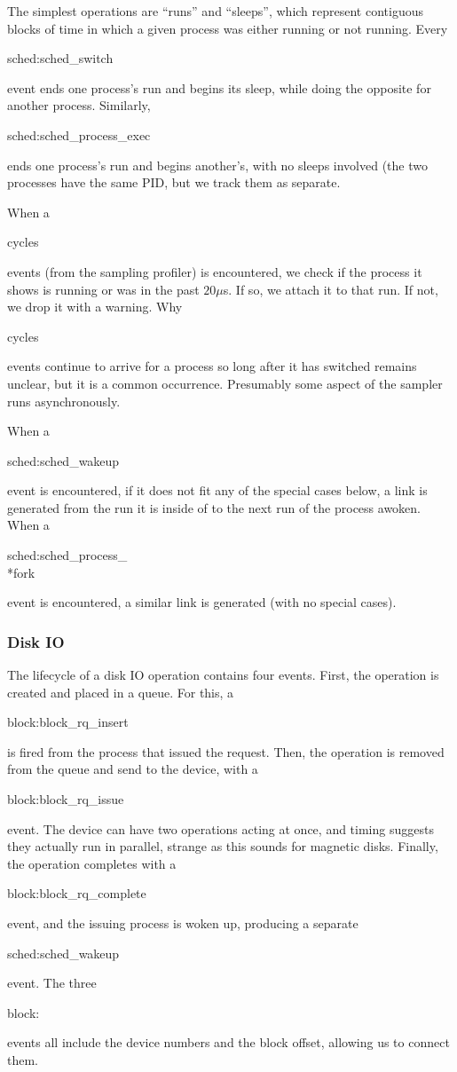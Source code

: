 \documentclass[10pt]{article}
\begin{document}
The simplest operations are ``runs'' and ``sleeps'', which represent contiguous blocks of time in which a given process was either running or not running.  Every \begin{tt}sched:sched\_switch\end{tt} event ends one process's run and begins its sleep, while doing the opposite for another process.  Similarly, \begin{tt}sched:sched\_process\_exec\end{tt} ends one process's run and begins another's, with no sleeps involved (the two processes have the same PID, but we track them as separate.

When a \begin{tt}cycles\end{tt} events (from the sampling profiler) is encountered, we check if the process it shows is running or was in the past $20 \mu$s.  If so, we attach it to that run.  If not, we drop it with a warning.  Why \begin{tt}cycles\end{tt} events continue to arrive for a process so long after it has switched remains unclear, but it is a common occurrence.  Presumably some aspect of the sampler runs asynchronously.

When a \begin{tt}sched:sched\_wakeup\end{tt} event is encountered, if it does not fit any of the special cases below, a link is generated from the run it is inside of to the next run of the process awoken.  When a \begin{tt}sched:sched\_process\_\\*fork\end{tt} event is encountered, a similar link is generated (with no special cases).

\subsubsection{Disk IO}

The lifecycle of a disk IO operation contains four events.  First, the operation is created and placed in a queue.  For this, a \begin{tt}block:block\_rq\_insert\end{tt} is fired from the process that issued the request.  Then, the operation is removed from the queue and send to the device, with a \begin{tt}block:block\_rq\_issue\end{tt} event.  The device can have two operations acting at once, and timing suggests they actually run in parallel, strange as this sounds for magnetic disks.  Finally, the operation completes with a \begin{tt}block:block\_rq\_complete\end{tt} event, and the issuing process is woken up, producing a separate \begin{tt}sched:sched\_wakeup\end{tt} event.  The three \begin{tt}block:\end{tt} events all include the device numbers and the block offset, allowing us to connect them.
\end{document}
